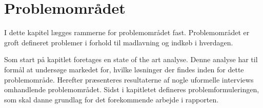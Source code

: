 \chapter{Problemområdet}\label{chapter:problemområde}
I dette kapitel lægges rammerne for problemområdet fast.
Problemområdet er groft defineret problemer i forhold til madlavning og indkøb i hverdagen.

Som start på kapitlet foretages en state of the art analyse.
Denne analyse har til formål at undersøge markedet for, hvilke løsninger der findes inden for dette problemområde.
Herefter præsenteres resultaterne af nogle uformelle interviews omhandlende problemområdet.
Sidst i kapitletet defineres problemformuleringen, som skal danne grundlag for det forekommende arbejde i rapporten.




